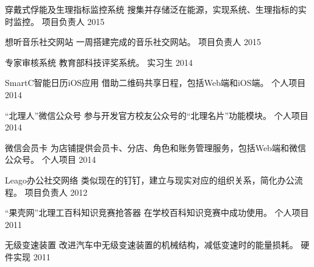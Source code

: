 \begin{cventries}
\begin{cvhonors}
\cvhonor
{穿戴式俘能及生理指标监控系统} %
{搜集并存储泛在能源，实现系统、生理指标的实时监控。} %
{项目负责人} %
{2015} %

\cvhonor
{想听音乐社交网站} %
{一周搭建完成的音乐社交网站。} %
{项目负责人} %
{2015} %

\cvhonor
{专家审核系统} %
{教育部科技评奖系统。} %
{实习生} %
{2014} %

\cvhonor
{SmartC智能日历iOS应用} %
{借助二维码共享日程，包括Web端和iOS端。} %
{个人项目} %
{2014} %

\cvhonor
{“北理人”微信公众号} %
{参与开发官方校友公众号的“北理名片”功能模块。} %
{个人项目} %
{2014} %

\cvhonor
{微信会员卡} %
{为店铺提供会员卡、分店、角色和账务管理服务，包括Web端和微信公众号。} %
{个人项目} %
{2014} %

\cvhonor
{Leago办公社交网络} %
{类似现在的钉钉，建立与现实对应的组织关系，简化办公流程。} %
{项目负责人} %
{2012} %

\cvhonor
{“果壳网”北理工百科知识竞赛抢答器} %
{在学校百科知识竞赛中成功使用。} %
{个人项目} %
{2011} %

\cvhonor
{无级变速装置} %
{改进汽车中无级变速装置的机械结构，减低变速时的能量损耗。} %
{硬件实现} %
{2011} %

\end{cvhonors}


\end{cventries}
